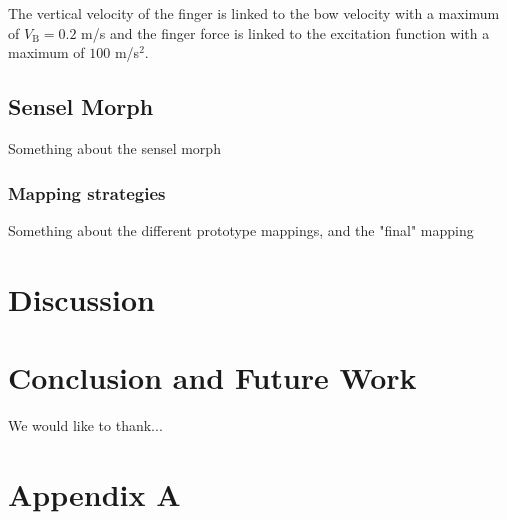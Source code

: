 \documentclass{article}
\begin{document}
The vertical velocity of the finger is linked to the bow velocity with a maximum of $V_\text{B} = 0.2$ m/s and the finger force is linked to the excitation function with a maximum of $100$ m/s$^2$.

\subsection{Sensel Morph}
Something about the sensel morph
\subsubsection{Mapping strategies}
Something about the different prototype mappings, and the "final" mapping 

\section{Discussion}\label{sec:discussion}


\section{Conclusion and Future Work}\label{sec:conclusion}

\begin{acknowledgments}
We would like to thank...
\end{acknowledgments} 



\section{Appendix A}
\end{document}
